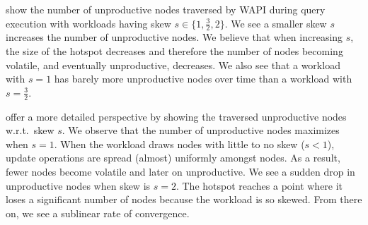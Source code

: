 \documentclass[abstracton,12pt]{scrartcl}
\theoremstyle{definition}
\begin{document}
 show the number
of unproductive nodes traversed by WAPI during query execution with workloads having skew
$s \in \{1,\frac{3}{2},2\}$.  We see a smaller
skew $s$ increases the number of unproductive nodes. We believe that when increasing $s$, 
the size of the hotspot decreases and therefore the number of nodes
becoming volatile, and eventually unproductive, decreases.
We also see that a workload with $s = 1$ has barely more unproductive nodes over time
than a workload with $s = \frac{3}{2}$.

 offer a more detailed
perspective by showing the traversed unproductive nodes w.r.t.\ skew $s$. 
We observe that the number of unproductive nodes maximizes when $s = 1$. When the
workload draws nodes with little to no skew ($s < 1$), update operations are
spread (almost) uniformly amongst nodes. As a result, fewer nodes become volatile
and later on unproductive.
We see a sudden drop in unproductive nodes when skew is $s = 2$. 
The hotspot reaches a point where it loses a significant number of nodes because the 
workload is so skewed. From there on, we see a sublinear rate of convergence. 


\end{document}
